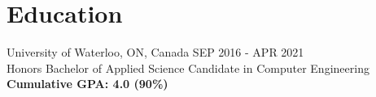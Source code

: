 \documentclass[]{friggeri-cv}
\begin{document}
\section{Education}

\begin{entrylist}
	\entry
	{\vspace{0.1cm}University of Waterloo, ON, Canada \hfill{\normalfont\footnotesize{}SEP 2016 - APR 2021}}
	{\\{\vspace{0.2cm}\normalsize\normalfont Honors Bachelor of Applied Science Candidate in Computer Engineering}}
	{
		\textbf{{Cumulative GPA: 4.0 (90\%)}}
	}
\end{entrylist}

% 
\end{document}
